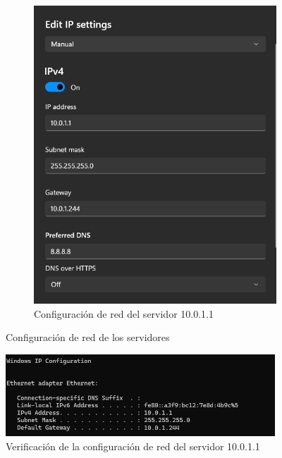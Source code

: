 \documentclass[%
    school=etsisi,%
    degree=61TI,%
]{upm-report}
\begin{document}
\begin{figure}
\begin{subfigure}{0.49\textwidth}
        \includegraphics[width=\linewidth]{figures/ip-config-02.png}
        \caption{\label{fig:ip-config-02} Configuración de red del servidor 10.0.1.1}
    \end{subfigure}
    \caption{\label{fig:ip-config} Configuración de red de los servidores}
\end{figure}

\begin{figure}
    \centering
    \includegraphics[width=0.9\textwidth]{figures/ip-config-check-01.png}
    \caption{\label{fig:ip-config-check} Verificación de la configuración de red del servidor 10.0.1.1}
\end{figure}
\end{document}
